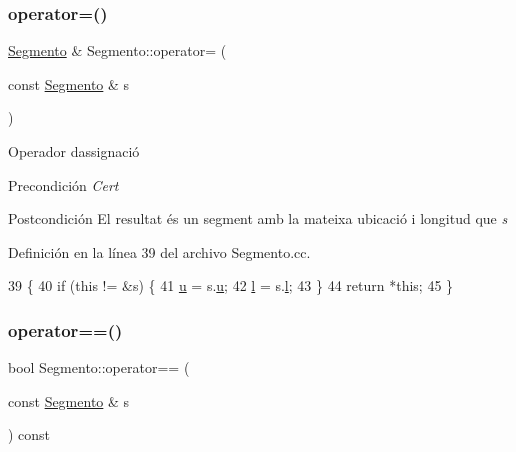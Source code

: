 \subsubsection{\texorpdfstring{operator=()}{operator=()}}
{\footnotesize\ttfamily \hyperlink{class_segmento}{Segmento} \& Segmento\+::operator= (\begin{DoxyParamCaption}\item[{const \hyperlink{class_segmento}{Segmento} \&}]{s }\end{DoxyParamCaption})}



Operador d\textquotesingle{}assignació 

\begin{DoxyPrecond}{Precondición}
{\itshape Cert} 
\end{DoxyPrecond}
\begin{DoxyPostcond}{Postcondición}
El resultat és un segment amb la mateixa ubicació i longitud que {\itshape s} 
\end{DoxyPostcond}


Definición en la línea 39 del archivo Segmento.\+cc.


\begin{DoxyCode}
39                                                \{
40   \textcolor{keywordflow}{if} (\textcolor{keyword}{this} != &s) \{
41     \hyperlink{class_segmento_a7fab9490df9b1b655bb88c2deb6e72ef}{u} = s.\hyperlink{class_segmento_a7fab9490df9b1b655bb88c2deb6e72ef}{u};
42     \hyperlink{class_segmento_a8b59abc9de156b52370dd759beab031d}{l} = s.\hyperlink{class_segmento_a8b59abc9de156b52370dd759beab031d}{l};
43   \}
44   \textcolor{keywordflow}{return} *\textcolor{keyword}{this};
45 \}
\end{DoxyCode}
\mbox{\label{class_segmento_a1f1e5977425950af37d4ca52761d381a}} 
\subsubsection{\texorpdfstring{operator==()}{operator==()}}
{\footnotesize\ttfamily bool Segmento\+::operator== (\begin{DoxyParamCaption}\item[{const \hyperlink{class_segmento}{Segmento} \&}]{s }\end{DoxyParamCaption}) const}



